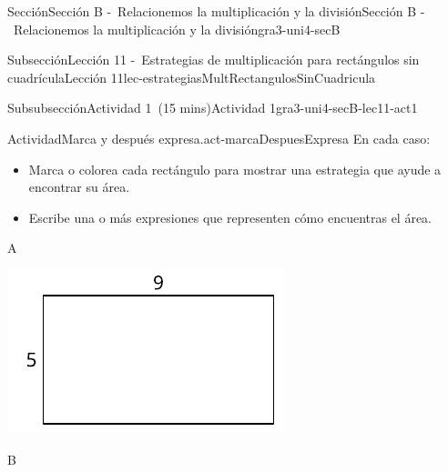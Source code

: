 \documentclass[oneside,10pt,]{article}
\begin{document}
\begin{sectionptx}{Sección}{Sección B -~Relacionemos la multiplicación y la división}{}{Sección B -~Relacionemos la multiplicación y la división}{}{}{gra3-uni4-secB}
\begin{subsectionptx}{Subsección}{Lección 11 -~Estrategias de multiplicación para rectángulos sin cuadrícula}{}{Lección 11}{}{}{lec-estrategiasMultRectangulosSinCuadricula}
\begin{subsubsectionptx}{Subsubsección}{Actividad 1~(15 mins)}{}{Actividad 1}{}{}{gra3-uni4-secB-lec11-act1}
\begin{activity}{Actividad}{Marca y después expresa.}{act-marcaDespuesExpresa}%
En cada caso:%
%
\begin{itemize}[label=\textbullet]
\item{}Marca o colorea cada rectángulo para mostrar una estrategia que ayude a encontrar su área.%
\item{}Escribe una o más expresiones que representen cómo encuentras el área.%
\end{itemize}
\begin{sidebyside}{3}{0}{0}{0}%
\begin{sbspanel}{0.391}%
A%
\par
\includegraphics[width=\linewidth]{external/svg-source/tikz-file-153084.pdf}
\end{sbspanel}%
\begin{sbspanel}{0.261}%
B%
\par

\end{sbspanel}
\end{sidebyside}
\end{activity}
\end{subsubsectionptx}
\end{subsectionptx}
\end{sectionptx}
\end{document}
